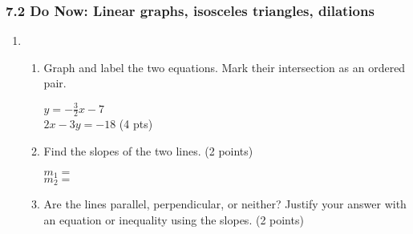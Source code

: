 \documentclass[12pt, twoside]{article}
\begin{document}
\subsubsection*{7.2 Do Now: Linear graphs, isosceles triangles, dilations}
  \begin{enumerate}
  \item \begin{enumerate}
    \item Graph and label the two equations. Mark their intersection as an ordered pair.
      \begin{multicols}{2}
        $y =-\frac{3}{2}x-7$ \\
        $2x-3y=-18$ \hfill (4 pts)
      \end{multicols}     \vspace{1.5cm}
    \item Find the slopes of the two lines. \hfill (2 points)
      \begin{multicols}{2}
        $m_1=$ \\
        $m_2=$
      \end{multicols}
    \item Are the lines parallel, perpendicular, or neither? Justify your answer with an equation or inequality using the slopes. \hfill (2 points)
    \vspace{1.5cm}
  \end{enumerate}
    \begin{center}
    \end{center}


\end{enumerate}
\end{document}
